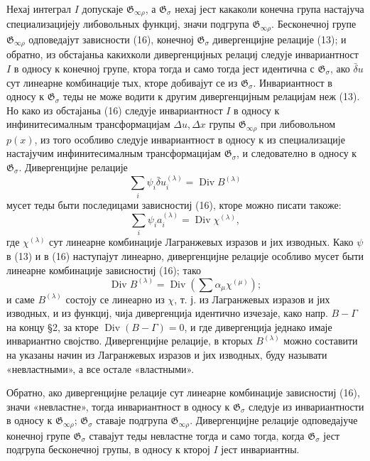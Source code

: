 ﻿\documentclass[11pt]{article}
\providecommand{\G}{\mathfrak G}
\providecommand{\D}{\Delta}
\DeclareMathOperator{\Div}{Div}
\providecommand{\bd}{\bar{\delta}}
\begin{document}
Нехај интеграл \(I\) допускаје \(\G_{\infty\rho}\), а \(\G_\sigma\) нехај јест какаколи конечна група настајуча специализацијеју либовольных функциј, значи подгрупа \(\G_{\infty\rho}\). Бесконечној групе \(\G_{\infty\rho}\) одповедајут зависности (16), конечној \(\G_\sigma\) дивергенцијне релације (13); и обратно, из обстајаньа какихколи дивергенцијных релациј следује инвариантност \(I\) в односу к конечној групе, ктора тогда и само тогда јест идентична с \(\G_\sigma\), ако \(\bd u\) сут линеарне комбинације тых, кторе добивајут се из \(\G_\sigma\). Инвариантност в односу к \(\G_\sigma\) теды не може водити к другим дивергенцијным релацијам неж (13). Но како из обстајаньа (16) следује инвариантност \(I\) в односу к инфинитесималным трансформацијам \(\D u,\D x\) групы \(\G_{\infty\rho}\) при либовольном \(p(x)\), из того особливо следује инвариантност в односу к из специализације настајучим инфинитесималным трансформацијам \(\G_\sigma\), и следователно в односу к \(\G_\sigma\). Дивергенцијне релације
\[
\sum_i\psi_i\bd u_i^{(\lambda)}=\Div B^{(\lambda)}
\]
мусет теды быти последицами зависностиј (16), кторе можно писати такоже:
\[
\sum_i\psi_i a_i^{(\lambda)}=\Div\chi^{(\lambda)},
\]
где \(\chi^{(\lambda)}\) сут линеарне комбинације Лагранжевых изразов и јих изводных. Како \(\psi\) в (13) и в (16) наступајут линеарно, дивергенцијне релације особливо мусет быти линеарне комбинације зависностиј (16); тако
\[
\Div B^{(\lambda)}=\Div\left(\sum \alpha_\mu\chi^{(\mu)}\right);
\]
и саме \(B^{(\lambda)}\) состоју се линеарно из \(\chi\), т. ј. из Лагранжевых изразов и јих изводных, и из функциј, чија дивергенција идентично изчезаје, како напр. \(B-\Gamma\) на концу \S{}2, за кторе \(\Div(B-\Gamma)=0\), и где дивергенција једнако имаје инвариантно својство. Дивергенцијне релације, в кторых \(B^{(\lambda)}\) можно составити на указаны начин из Лагранжевых изразов и јих изводных, буду называти «невластными», а все остале «властными».

Обратно, ако дивергенцијне релације сут линеарне комбинације зависностиј (16), значи «невластне», тогда инвариантност в односу к \(\G_\sigma\) следује из инвариантности в односу к \(\G_{\infty\rho}\); \(\G_\sigma\) ставаје подгрупа \(\G_{\infty\rho}\). Дивергенцијне релације одповедајуче конечној групе \(\G_\sigma\) ставајут теды невластне тогда и само тогда, когда \(\G_\sigma\) јест подгрупа бесконечној групы, в односу к кторој \(I\) јест инвариантны.
\end{document}
